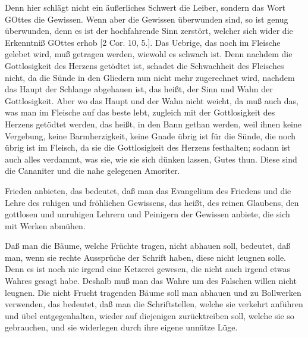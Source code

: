 Denn hier schlägt nicht ein äußerliches Schwert die Leiber, sondern das Wort GOttes die Gewissen. Wenn aber die Gewissen überwunden sind, so ist genug überwunden, denn es ist der hochfahrende Sinn zerstört, welcher sich wider die Erkenntniß GOttes erhob [2 Cor. 10, 5.]. Das Uebrige, das noch im Fleische gelebet wird, muß getragen werden, wiewohl es schwach ist. Denn nachdem die Gottlosigkeit des Herzens getödtet ist, schadet die Schwachheit des Fleisches nicht, da die Sünde in den Gliedern nun nicht mehr zugerechnet wird, nachdem das Haupt der Schlange abgehauen ist, das heißt, der Sinn und Wahn der Gottlosigkeit. Aber wo das Haupt und der Wahn nicht weicht, da muß auch das, was man im Fleische auf das beste lebt, zugleich mit der Gottlosigkeit des Herzens getödtet werden, das heißt, in den Bann gethan werden, weil ihnen keine Vergebung, keine Barmherzigkeit, keine Gnade übrig ist für die Sünde, die noch übrig ist im Fleisch, da sie die Gottlosigkeit des Herzens festhalten; sodann ist auch alles verdammt, was sie, wie sie sich dünken lassen, Gutes thun. Diese sind die Cananiter und die nahe gelegenen Amoriter.

Frieden anbieten, das bedeutet, daß man das Evangelium des Friedens und die Lehre des ruhigen und fröhlichen Gewissens, das heißt, des reinen Glaubens, den gottlosen und unruhigen Lehrern und Peinigern der Gewissen anbiete, die sich mit Werken abmühen.

Daß man die Bäume, welche Früchte tragen, nicht abhauen soll, bedeutet, daß man, wenn sie rechte Aussprüche der Schrift haben, diese nicht leugnen solle. Denn es ist noch nie irgend eine Ketzerei gewesen, die nicht auch irgend etwas Wahres gesagt habe. Deshalb muß man das Wahre um des Falschen willen nicht leugnen. Die nicht Frucht tragenden Bäume soll man abhauen und zu Bollwerken verwenden, das bedeutet, daß man die Schriftstellen, welche sie verkehrt anführen und übel entgegenhalten, wieder auf diejenigen zurücktreiben soll, welche sie so gebrauchen, und sie widerlegen durch ihre eigene unnütze Lüge.

